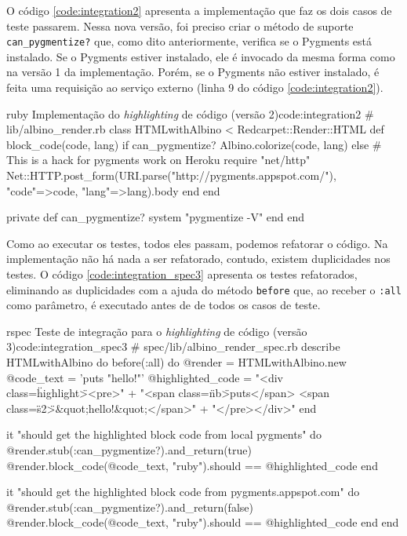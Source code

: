 O código \ref{code:integration2} apresenta a implementação que faz os dois casos de teste passarem. Nessa nova versão, foi preciso criar o método de suporte \texttt{can\_pygmentize?} que, como dito anteriormente, verifica se o Pygments está instalado. Se o Pygments estiver instalado, ele é invocado da mesma forma como na versão 1 da implementação. Porém, se o Pygments não estiver instalado, é feita uma requisição ao serviço externo (linha 9 do código \ref{code:integration2}).

\begin{mycode}{ruby}%
{Implementação do \textit{highlighting} de código (versão 2)}{code:integration2}
# lib/albino_render.rb
class HTMLwithAlbino < Redcarpet::Render::HTML
  def block_code(code, lang)
    if can_pygmentize?
      Albino.colorize(code, lang)
    else
      # This is a hack for pygments work on Heroku
      require "net/http"
      Net::HTTP.post_form(URI.parse("http://pygments.appspot.com/"),
                          {"code"=>code, "lang"=>lang}).body
    end
  end

  private
  def can_pygmentize?
    system "pygmentize -V"
  end
end
\end{mycode}

Como ao executar os testes, todos eles passam, podemos refatorar o código. Na implementação não há nada a ser refatorado, contudo, existem duplicidades nos testes. O código \ref{code:integration_spec3} apresenta os testes refatorados, eliminando as duplicidades com a ajuda do método \texttt{before} que, ao receber o \texttt{:all} como parâmetro, é executado antes de de todos os casos de teste.

\begin{mycode}{rspec}%
{Teste de integração para o \textit{highlighting} de código (versão 3)}{code:integration_spec3}
# spec/lib/albino_render_spec.rb
describe HTMLwithAlbino do
  before(:all) do
    @render = HTMLwithAlbino.new
    @code_text = 'puts "hello!"'
    @highlighted_code =
      "<div class=\"highlight\"><pre>" +
        "<span class=\"nb\">puts</span> <span class=\"s2\">&quot;hello!&quot;</span>\n" +
      "</pre>\n</div>\n"
  end

  it "should get the highlighted block code from local pygments" do
    @render.stub(:can_pygmentize?).and_return(true)
    @render.block_code(@code_text, "ruby").should == @highlighted_code
  end

  it "should get the highlighted block code from pygments.appspot.com" do
    @render.stub(:can_pygmentize?).and_return(false)
    @render.block_code(@code_text, "ruby").should == @highlighted_code
  end
end
\end{mycode}

